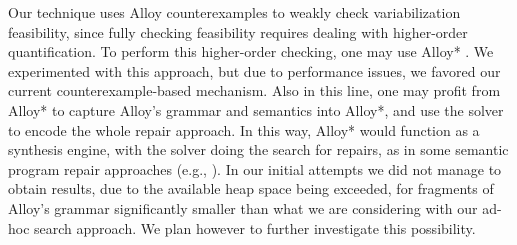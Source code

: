 Our technique uses Alloy counterexamples to weakly check variabilization feasibility, since fully checking feasibility requires dealing with higher-order quantification. To perform this higher-order checking, one may use Alloy* \cite{DBLP:journals/fmsd/MilicevicNKJ19}. We experimented with this approach, but due to performance issues, we favored our current counterexample-based mechanism. Also in this line, one may profit from Alloy* to capture Alloy's grammar and semantics into Alloy*, and use the solver to encode the whole repair approach. In this way, Alloy* would function as a synthesis engine, with the solver doing the search for repairs, as in some semantic program repair approaches (e.g., \cite{Mechtaev+2016}). In our initial attempts we did not manage to obtain results, due to the available heap space being exceeded, for fragments of Alloy's grammar significantly smaller than what we are considering with our ad-hoc search approach. We plan however to further investigate this possibility. 

